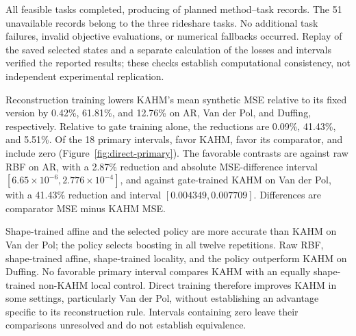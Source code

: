 All \DirectAvailableTasks{} feasible tasks completed, producing
\DirectAvailableOutputs{} of \DirectPlannedOutputs{} planned
method--task records. The 51 unavailable records belong to the three
rideshare tasks. No additional task failures, invalid objective
evaluations, or numerical fallbacks occurred. Replay of the saved
selected states and a separate calculation of the losses and intervals
verified the reported results; these checks establish computational
consistency, not independent experimental replication.

\begin{table}[t]
\centering\small
\setlength{\tabcolsep}{5pt}
\caption{Direct-reconstruction forecasting results. Synthetic entries are
mean MSE over twelve repetitions per law. Natural entries average scaled
MSE equally over the three available collections, after averaging within
collection. The planned four-collection aggregate is undefined.
``Reconstruction'' denotes the corresponding shape intervention for
non-KAHM controls.}
\label{tab:direct-methods}

\end{table}

Reconstruction training lowers KAHM's mean synthetic MSE relative to
its fixed version by 0.42\%, 61.81\%, and 12.76\% on AR, Van der Pol,
and Duffing, respectively. Relative to gate training alone, the
reductions are 0.09\%, 41.43\%, and 5.51\%. Of the 18 primary
intervals, \DirectPrimaryPositive{} favor KAHM,
\DirectPrimaryNegative{} favor its comparator, and
\DirectPrimaryUnresolved{} include zero
(Figure~\ref{fig:direct-primary}). The favorable contrasts are against
raw RBF on AR, with a 2.87\% reduction and absolute MSE-difference
interval $[6.65\!\times\!10^{-6},2.776\!\times\!10^{-4}]$, and against
gate-trained KAHM on Van der Pol, with a 41.43\% reduction and interval
$[0.004349,0.007709]$. Differences are comparator MSE minus KAHM MSE.

Shape-trained affine and the selected policy are more accurate than
KAHM on Van der Pol; the policy selects boosting in all twelve
repetitions. Raw RBF, shape-trained affine, shape-trained locality,
and the policy outperform KAHM on Duffing. No favorable primary
interval compares KAHM with an equally shape-trained non-KAHM local
control. Direct training therefore improves KAHM in some settings,
particularly Van der Pol, without establishing an advantage specific
to its reconstruction rule. Intervals containing zero leave their
comparisons unresolved and do not establish equivalence.

